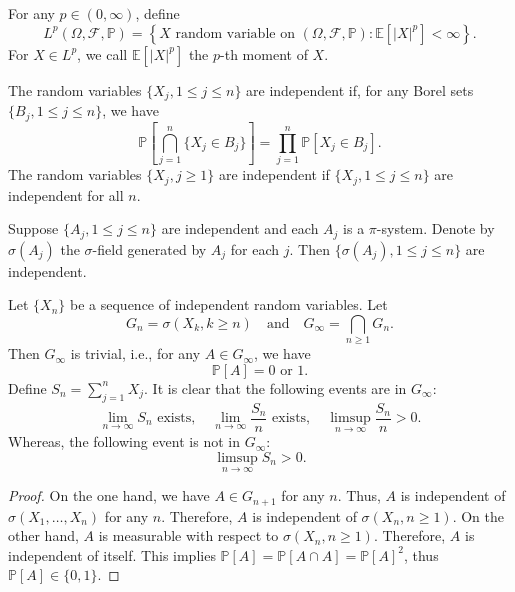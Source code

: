 \begin{defn}[$p$-th Moment]
    For any \( p \in (0, \infty) \), define
    \[
    L^p(\Omega, \mathcal{F}, \mathbb{P}) = \left\{ X \text{ random variable on } (\Omega, \mathcal{F}, \mathbb{P}) : \mathbb{E}[|X|^p] < \infty \right\}.
    \]
    For \( X \in L^p \), we call \( \mathbb{E}[|X|^p] \) the \( p \)-th moment of \( X \).
\end{defn}

\begin{defn}[Independent]
    The random variables \( \{ X_j, 1 \leq j \leq n \} \) are independent if, for any Borel sets \( \{ B_j, 1 \leq j \leq n \} \), we have
    \[
    \mathbb{P}\left[\bigcap_{j=1}^n \{ X_j \in B_j \}\right] = \prod_{j=1}^n \mathbb{P}[X_j \in B_j].
    \]
    The random variables \( \{ X_j, j \geq 1 \} \) are independent if \( \{ X_j, 1 \leq j \leq n \} \) are independent for all \( n \).
\end{defn}

\begin{thm}
    Suppose \( \{ A_j, 1 \leq j \leq n \} \) are independent and each \( A_j \) is a \(\pi\)-system. Denote by \( \sigma(A_j) \) the \(\sigma\)-field generated by \( A_j \) for each \( j \). Then \( \{ \sigma(A_j), 1 \leq j \leq n \} \) are independent.
\end{thm}

\begin{exam}
    Let \( \{ X_n \} \) be a sequence of independent random variables. Let
    \[
    G_n = \sigma(X_k, k \geq n) \quad \text{and} \quad G_\infty = \bigcap_{n \geq 1} G_n.
    \]
    Then \( G_\infty \) is trivial, i.e., for any \( A \in G_\infty \), we have
    \[
    \mathbb{P}[A] = 0 \text{ or } 1.
    \]
    Define \( S_n = \sum_{j=1}^{n} X_j \). It is clear that the following events are in \( G_\infty \):
    \[
    \lim_{n \to \infty} S_n \text{ exists}, \quad \lim_{n \to \infty} \frac{S_n}{n} \text{ exists}, \quad \limsup_{n \to \infty} \frac{S_n}{n} > 0.
    \]
    Whereas, the following event is not in \( G_\infty \):
    \[
    \limsup_{n \to \infty} S_n > 0.
    \]
\end{exam}

\begin{proof}
    On the one hand, we have \( A \in G_{n+1} \) for any \( n \). Thus, \( A \) is independent of \( \sigma(X_1, \dots, X_n) \) for any \( n \). Therefore, \( A \) is independent of \( \sigma(X_n, n \geq 1) \). On the other hand, \( A \) is measurable with respect to \( \sigma(X_n, n \geq 1) \). Therefore, \( A \) is independent of itself. This implies \( \mathbb{P}[A] = \mathbb{P}[A \cap A] = \mathbb{P}[A]^2 \), thus \( \mathbb{P}[A] \in \{ 0, 1 \} \).
\end{proof}

